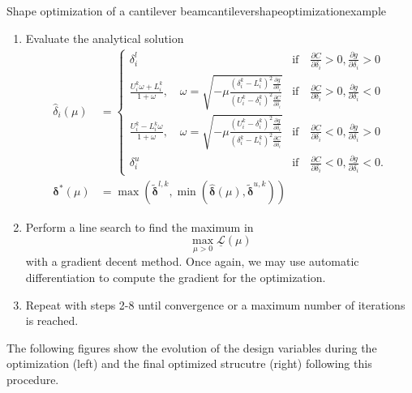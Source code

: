 \begin{example}{Shape optimization of a cantilever beam}{cantilevershapeoptimizationexample}
\begin{enumerate}
        \item Evaluate the analytical solution
            \begin{align}
                \hat{\delta}_i(\mu) &= 
                \begin{cases}
                    \delta^l_i 
                        &\textrm{if} \quad \frac{\partial C}{\partial \delta_i} > 0, \frac{\partial g}{\partial \delta_i} > 0 \\
                    \frac{U_i^k\omega + L_i^k}{1+\omega}, \quad \omega = \sqrt{-\mu\frac{(\delta_i^k-L_i^k)^2\frac{\partial g}{\partial \delta_i}}{(U_i^k-\delta_i^k)^2\frac{\partial C}{\partial \delta_i}}}
                        &\textrm{if} \quad \frac{\partial C}{\partial \delta_i}  > 0, \frac{\partial g}{\partial \delta_i} <0\\
                    \frac{U_i^k-L_i^k\omega}{1+\omega}, \quad \omega = \sqrt{-\mu\frac{(U_i^k-\delta_i^k)^2\frac{\partial g}{\partial \delta_i}}{(\delta_i^k-L_i^k)^2\frac{\partial C}{\partial \delta_i}}} 
                        &\textrm{if} \quad \frac{\partial C}{\partial \delta_i} < 0, \frac{\partial g}{\partial \delta_i}  > 0\\
                    \delta^u_i 
                        &\textrm{if} \quad \frac{\partial C}{\partial \delta_i}< 0, \frac{\partial g}{\partial \delta_i} < 0.
                \end{cases} \\
                \pmb{\delta}^* (\mu) &= \max\left(\tilde{\pmb{\delta}}^{l,k}, \min \left(\hat{\pmb{\delta}}(\mu), \tilde{\pmb{\delta}}^{u,k} \right)\right)
            \end{align}
        \item Perform a line search to find the maximum in 
            \begin{equation}
                \max_{\mu>0} \underline{\mathcal{L}}(\mu)
            \end{equation}
            with a gradient decent method. Once again, we may use automatic differentiation to compute the gradient for the optimization.
        \item Repeat with steps 2-8 until convergence or a maximum number of iterations is reached.
    \end{enumerate}
    
    The following figures show the evolution of the design variables during the optimization (left) and the final optimized strucutre (right) following this procedure. 


\end{example}
